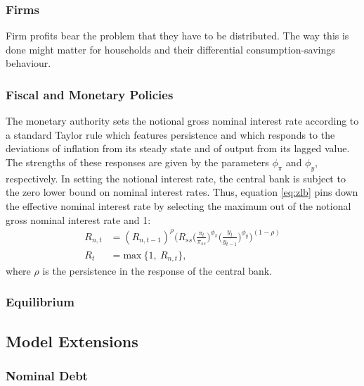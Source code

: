 \documentclass[12pt]{article} %
\numberwithin{equation}{section} %
\begin{document}
\subsubsection{Firms}
\label{sec:model-firms}

Firm profits bear the problem that they have to be distributed. The way this is done might matter for households and their differential consumption-savings behaviour. 

\subsubsection{Fiscal and Monetary Policies}
\label{sec:model-policy}

The monetary authority sets the notional gross nominal interest rate according to a standard Taylor rule which features persistence and which responds to the deviations of inflation from its steady state and of output from its lagged value. The strengths of these responses are given by the parameters $\phi_{\pi}$ and $\phi_y$, respectively. In setting the notional interest rate, the central bank is subject to the zero lower bound on nominal interest rates. Thus, equation \eqref{eq:zlb} pins down the effective nominal interest rate by selecting the maximum out of the notional gross nominal interest rate and 1:
\begin{align}
    R_{n,t} &= ( R_{n,t-1} )^{\rho} \Bigg( R_{ss} \Bigg( \frac{\pi_t}{\pi_{ss}} \Bigg)^{\phi_{\pi}} \Bigg( \frac{y_t}{y_{t-1}} \Bigg)^{\phi_y} \Bigg)^{(1-\rho)} \label{eq:taylorrule} \\
    R_t &= \text{max} \ \{ 1, \ R_{n,t} \}, \label{eq:zlb}
\end{align}
where $\rho$ is the persistence in the response of the central bank.

\subsubsection{Equilibrium}
\label{sec:model-eq}

\subsection{Model Extensions}
\label{sec:model-extensions}

\subsubsection{Nominal Debt}
\label{sec:model-extensions-realdebt}
\end{document}
